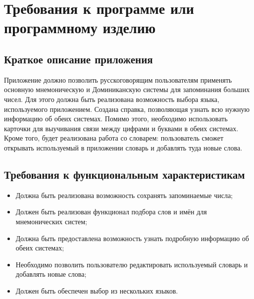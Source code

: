 \documentclass[draft]{article}
\begin{document}
\section {Требования к программе или программному изделию}
\subsection{Краткое описание приложения}
Приложение должно позволить русскоговорящим пользователям применять основную мнемоническую и Доминиканскую системы для запоминания больших чисел. Для этого должна быть реализована возможность выбора языка, используемого приложением. Создана справка, позволяющая узнать всю нужную информацию об обеих системах. Помимо этого, необходимо использовать карточки для выучивания связи между цифрами и буквами в обеих системах. Кроме того, будет реализована работа со словарем: пользователь сможет открывать используемый в приложении словарь и добавлять туда новые слова.
\subsection{Требования к функциональным характеристикам}
\begin{itemize}
\item Должна быть реализована возможность сохранять запоминаемые числа;
\item Должен быть реализован функционал подбора слов и имён для мнемонических систем;
\item Должна быть предоставлена возможность узнать подробную информацию об обеих системах;
\item Необходимо позволить пользователю редактировать используемый словарь и добавлять новые слова;
\item Должен быть обеспечен выбор из нескольких языков.
\end{itemize}
\end{document}
